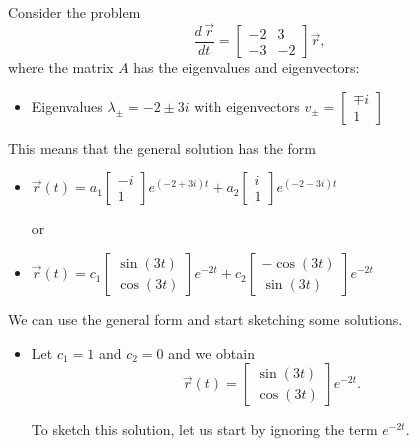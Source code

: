 \begin{example}
Consider the problem
$$
\frac{d \, \vec{r}}{dt} = \begin{bmatrix} -2 & 3 \\ -3 & -2 \end{bmatrix} \vec{r},
$$
where the matrix $A$ has the eigenvalues and eigenvectors:
\begin{itemize}
	\item Eigenvalues $\lambda_{\pm} = -2 \pm 3i$ with eigenvectors $v_{\pm} = \begin{bmatrix} \mp i \\ 1 \end{bmatrix}$
\end{itemize}

This means that the general solution has the form
\begin{itemize}
	\item $\displaystyle \vec{r}(t) = a_1 \begin{bmatrix} -i \\ 1 \end{bmatrix} e^{(-2+3i)t} + a_2 \begin{bmatrix} i \\ 1 \end{bmatrix} e^{(-2-3i)t}$

	\item[or]
	\item $\displaystyle \vec{r}(t) = c_1 \begin{bmatrix}	 \sin(3t) \\ \cos(3t) \end{bmatrix} e^{-2t} + c_2 \begin{bmatrix}	 -\cos(3t) \\ \sin(3t) \end{bmatrix} e^{-2t}$ \\
\end{itemize}

We can use the general form and start sketching some solutions.

\begin{itemize}
	\item Let $c_1=1$ and $c_2=0$ and we obtain
	$$ \vec{r}(t) = \begin{bmatrix}	 \sin(3t) \\ \cos(3t) \end{bmatrix} e^{-2t}.$$
	
	To sketch this solution, let us start by ignoring the term $e^{-2t}$. 
	

\end{itemize}
\end{example}
